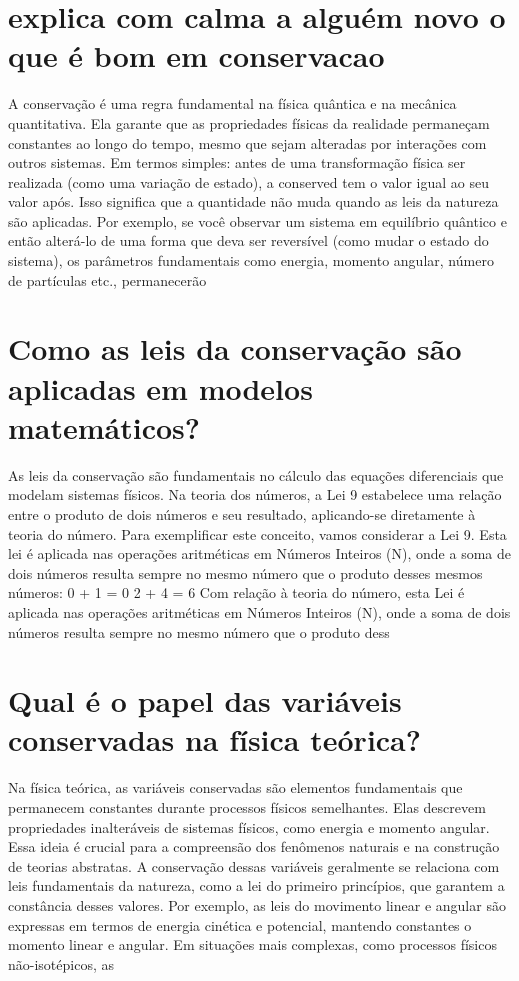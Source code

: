 \documentclass[11pt,a4paper]{article}
\begin{document}
\section{explica com calma a alguém novo o que é bom em conservacao}
A conservação é uma regra fundamental na física quântica e na mecânica quantitativa. Ela garante que as propriedades físicas da realidade permaneçam constantes ao longo do tempo, mesmo que sejam alteradas por interações com outros sistemas. Em termos simples: antes de uma transformação física ser realizada (como uma variação de estado), a conserved tem o valor igual ao seu valor após. Isso significa que a quantidade não muda quando as leis da natureza são aplicadas. Por exemplo, se você observar um sistema em equilíbrio quântico e então alterá-lo de uma forma que deva ser reversível (como mudar o estado do sistema), os parâmetros fundamentais como energia, momento angular, número de partículas etc., permanecerão

\section{Como as leis da conservação são aplicadas em modelos matemáticos?}
As leis da conservação são fundamentais no cálculo das equações diferenciais que modelam sistemas físicos. Na teoria dos números, a Lei 9 estabelece uma relação entre o produto de dois números e seu resultado, aplicando-se diretamente à teoria do número. Para exemplificar este conceito, vamos considerar a Lei 9. Esta lei é aplicada nas operações aritméticas em Números Inteiros (N), onde a soma de dois números resulta sempre no mesmo número que o produto desses mesmos números: 0 + 1 = 0 2 + 4 = 6 Com relação à teoria do número, esta Lei é aplicada nas operações aritméticas em Números Inteiros (N), onde a soma de dois números resulta sempre no mesmo número que o produto dess

\section{Qual é o papel das variáveis conservadas na física teórica?}
Na física teórica, as variáveis conservadas são elementos fundamentais que permanecem constantes durante processos físicos semelhantes. Elas descrevem propriedades inalteráveis de sistemas físicos, como energia e momento angular. Essa ideia é crucial para a compreensão dos fenômenos naturais e na construção de teorias abstratas. A conservação dessas variáveis geralmente se relaciona com leis fundamentais da natureza, como a lei do primeiro princípios, que garantem a constância desses valores. Por exemplo, as leis do movimento linear e angular são expressas em termos de energia cinética e potencial, mantendo constantes o momento linear e angular. Em situações mais complexas, como processos físicos não-isotépicos, as
\end{document}
